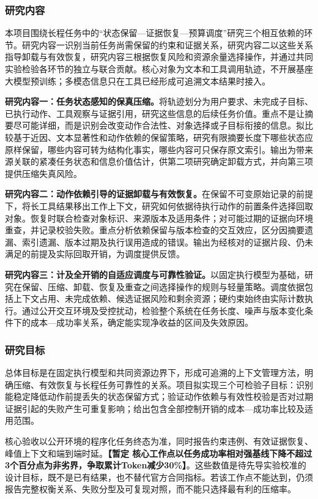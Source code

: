 \justifying
\NSFCBodyText

\subsubsection{研究内容}
本项目围绕长程任务中的“状态保留—证据恢复—预算调度”研究三个相互依赖的环节。研究内容一识别当前任务尚需保留的约束和证据关系，研究内容二以这些关系指导卸载与有效恢复，研究内容三根据恢复风险和资源余量选择操作，并通过共同实验检验各环节的独立与联合贡献。核心对象为文本和工具调用轨迹，不开展基座大模型预训练；多模态信息只在工具已经形成可追溯文本结果时接入。

\textbf{研究内容一：任务状态感知的保真压缩。}将轨迹划分为用户要求、未完成子目标、已执行动作、工具观察与证据引用，研究这些信息的后续任务价值。重点不是让摘要尽可能详细，而是识别会改变动作合法性、对象选择或子目标衔接的信息。拟比较基于近因、文本显著性和动作依赖的保留策略，研究有限摘要长度下哪些状态应原样保留，哪些内容可转为结构化事实，哪些内容可只保存原文索引。输出为带来源关联的紧凑任务状态和信息价值估计，供第二项研究确定卸载方式，并向第三项提供压缩失真风险。

\textbf{研究内容二：动作依赖引导的证据卸载与有效恢复。}在保留不可变原始记录的前提下，将长工具结果移出工作上下文，研究如何依据待执行动作的前置条件选择回取对象。恢复时联合检查对象标识、来源版本及适用条件；对可能过期的证据向环境重查，并记录校验失败。重点分析依赖保留与版本检查的交互效应，区分因摘要遗漏、索引遗漏、版本过期及执行误用造成的错误。输出为经核对的证据片段、仍未满足的前提及实际回取开销，为调度提供反馈。

\textbf{研究内容三：计及全开销的自适应调度与可靠性验证。}以固定执行模型为基础，研究在保留、压缩、卸载、恢复及重查之间选择操作的规则与轻量策略。调度依据包括上下文占用、未完成依赖、候选证据风险和剩余资源；硬约束始终由实际计数执行。通过公开交互环境及受控扰动，检验整个系统在任务长度、噪声与版本变化条件下的成本—成功率关系，确定能实现净收益的区间及失效原因。

\subsubsection{研究目标}
总体目标是在固定执行模型和共同资源边界下，形成可追溯的上下文管理方法，明确压缩、有效恢复与长程任务可靠性的关系。项目拟实现三个可检验子目标：识别能稳定降低动作前提丢失的状态保留方式；验证动作依赖与有效性校验是否对过期证据引起的失败产生可重复影响；给出包含全部控制开销的成本—成功率比较及适用范围。

核心验收以公开环境的程序化任务终态为准，同时报告约束违例、有效证据恢复、峰值上下文和端到端时延。\textbf{【暂定 核心工作点以任务成功率相对强基线下降不超过3个百分点为非劣界，争取累计Token减少30\%】}。这些数值是待先导实验校准的设计目标，既不是已有结果，也不替代官方合同指标。若该工作点不能达到，仍须报告完整权衡关系、失败分型及可复现对照，而不能只选择最有利的压缩率。

